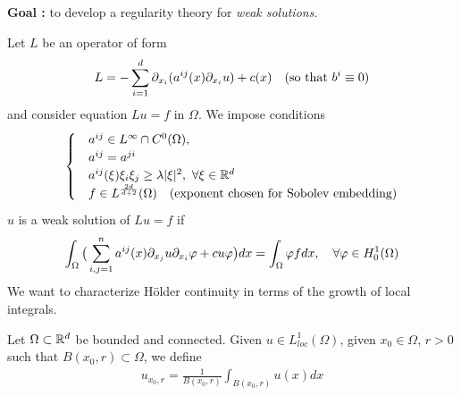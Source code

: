 \documentclass[12pt,a4paper]{article}
\begin{document}
\textbf{Goal :} to develop a regularity theory for \emph{weak solutions}. 
\s

Let $L$ be an operator of form
\begin{align*}
L = -\sum_{i=1}^d \partial_{x_i}(a^{ij}(x) \partial_{x_i} u) + c(x) \quad (\text{so that } b^i \equiv 0)
\end{align*}
and consider equation $Lu = f$ in $\Omega$. We impose conditions
\begin{align*}
\begin{cases}
& a^{ij} \in L^{\infty} \cap C^0(\Omega),\\
& a^{ij}= a^{ji} \\
& a^{ij}(\xi)\xi_i \xi_j \geq \lambda |\xi|^2, \,\, \forall \xi \in \mathbb{R}^d \\
& f\in L^{\frac{2d}{d+2}}(\Omega) \quad (\text{exponent chosen for Sobolev embedding})
\end{cases}
\end{align*}
$u$ is a weak solution of $Lu =f$ if
\begin{align*}
\int_{\Omega} \big( \sum_{i,j=1}^n a^{ij}(x) \partial_{x_j} u \partial_{x_i} \varphi + cu\varphi \big) dx = \int_{\Omega} \varphi f dx, \quad \forall \varphi \in H_0^1(\Omega)
\end{align*}
We want to characterize H\"older continuity in terms of the growth of local integrals.
\s

Let $\Omega \subset \mathbb{R}^d$ be bounded and connected. Given $u\in L^1_{loc}(\Omega)$, given $x_0 \in \Omega$, $r>0$ such that $B(x_0, r) \subset \Omega$, we define
\begin{align*}
u_{x_0, r} = \frac{1}{B(x_0, r)}\int_{B(x_0, r)} u(x) dx
\end{align*}
\s
\end{document}
